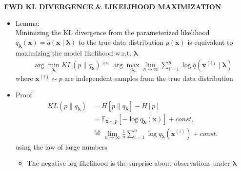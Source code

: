 \begin{whitebox}{\textbf{FWD KL DIVERGENCE \& LIKELIHOOD MAXIMIZATION}}
    \begin{itemize}
        \item Lemma:\\
        Minimizing the KL divergence from the parameterized likelihood $q_{\bm{\lambda}}(\bm{x})=q(\bm{x\mid \bm{\lambda}})$ to the true data distribution $p(\bm{x})$ is equivalent to maximizing the model likelihood w.r.t. $\bm{\lambda}$
        \begin{align*}
            \arg\min_{\bm{\lambda}}KL(p\|q_{\bm{\lambda}})\overset{\text{a.s.}}{=}\arg\max_{\bm{\lambda}}\lim_{n\to\infty}\sum_{i=1}^n\log q(\bm{x}^{(i)}\mid \bm{\lambda})
        \end{align*}
        where $\bm{x}^{(i)}\sim p$ are independent samples from the true data distribution
        \item Proof
        \begin{align*}
            KL(p\|q_{\bm{\lambda}})&=H[p\|q_{\bm{\lambda}}]-H[p]\\
            &=\mathbb{E}_{\bm{x}\sim p}[-\log q_{\bm{\lambda}}(\bm{x})]+const.\\
            &\overset{\text{a.s.}}{=}\lim_{n\to\infty}\frac{1}{n}\sum_{i=1}^n\log q_{\bm{\lambda}}(\bm{x}^{(i)})+const.
        \end{align*}
        using the law of large numbers
        \begin{itemize}
            \item The negative log-likelihood is the surprise about observations under $\bm{\lambda}$
        \end{itemize}
    \end{itemize}
\end{whitebox}


